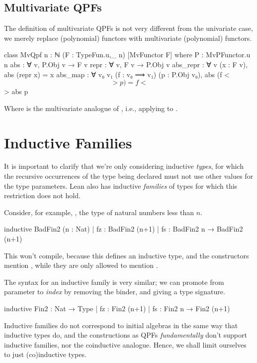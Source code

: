 \subsection*{Multivariate QPFs}
The definition of multivariate QPFs is not very different from the univariate case, we merely replace
(polynomial) functors with multivariate (polynomial) functors.

\begin{leancode}
  class MvQpf {n : ℕ} (F : TypeFun.{u,_} n) [MvFunctor F]  where
    P         : MvPFunctor.{u} n
    abs       : ∀ {v}, P.Obj v → F v
    repr      : ∀ {v}, F v → P.Obj v
    abs_repr  : ∀ {v} (x : F v), abs (repr x) = x
    abs_map   : ∀ {v₀ v₁} (f : v₀ ⟹ v₁) (p : P.Obj v₀), 
                    abs (f <$$> p) = f <$$> abs p
\end{leancode}

Where  is the multivariate analogue of , i.e., applying 
 to .


\section{Inductive Families}%
\label{sec:ind_families}

It is important to clarify that we're only considering inductive \emph{types}, 
for which the recursive occurrences of the type being declared must not use other values for the type parameters. Lean also has inductive \emph{families} of types for which this restriction does not hold.

Consider, for example, , the type of natural numbers less than $n$.
\begin{badleancode}
    inductive BadFin2 (n : Nat)
    | fz : BadFin2 (n+1)
    | fs : BadFin2 n → BadFin2 (n+1)
\end{badleancode}

This won't compile, because this defines an inductive type, and the constructors mention , while they are only allowed to mention .

The syntax for an inductive family is very similar; we can promote  from parameter to \emph{index} by removing the binder, and giving a type signature.

\begin{leancode}
    inductive Fin2 : Nat → Type
    | fz : Fin2 (n+1)
    | fs : Fin2 n → Fin2 (n+1)
\end{leancode}

Inductive families do not correspond to initial algebras in the same way that inductive types do, and the constructions as QPFs \emph{fundamentally} don't support inductive families, nor the coinductive analogue.
Hence, we shall limit ourselves to just (co)inductive types.
